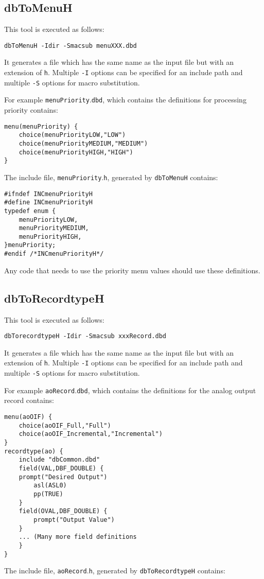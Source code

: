 \subsection{dbToMenuH}

This tool is executed as follows:

\begin{verbatim}dbToMenuH -Idir -Smacsub menuXXX.dbd
\end{verbatim}It generates a file which has the same name as the input file but with an extension of \verb|h|. Multiple \verb|-I| options can be 
specified for an include path and multiple \verb|-S| options for macro substitution.

For example \verb|menuPriority|.\verb|dbd|, which contains the definitions for processing priority contains:

\begin{verbatim}menu(menuPriority) {
    choice(menuPriorityLOW,"LOW")
    choice(menuPriorityMEDIUM,"MEDIUM")
    choice(menuPriorityHIGH,"HIGH")
}
\end{verbatim}The include file, \verb|menuPriority|.\verb|h|, generated by \verb|dbToMenuH| contains:

\begin{verbatim}#ifndef INCmenuPriorityH
#define INCmenuPriorityH
typedef enum {
    menuPriorityLOW,
    menuPriorityMEDIUM,
    menuPriorityHIGH,
}menuPriority;
#endif /*INCmenuPriorityH*/

\end{verbatim}Any code that needs to use the priority menu values should use these definitions.

\subsection{dbToRecordtypeH}

This tool is executed as follows:

\begin{verbatim}dbTorecordtypeH -Idir -Smacsub xxxRecord.dbd
\end{verbatim}It generates a file which has the same name as the input file but with an extension of \verb|h|. Multiple \verb|-I| options can be 
specified for an include path and multiple \verb|-S| options for macro substitution.

For example \verb|aoRecord|.\verb|dbd|, which contains the definitions for the analog output record contains:

\begin{verbatim}
menu(aoOIF) {
    choice(aoOIF_Full,"Full")
    choice(aoOIF_Incremental,"Incremental")
}
recordtype(ao) {
    include "dbCommon.dbd"
    field(VAL,DBF_DOUBLE) {
    prompt("Desired Output")
        asl(ASL0)
        pp(TRUE)
    }
    field(OVAL,DBF_DOUBLE) {
        prompt("Output Value")
    }
    ... (Many more field definitions
    }
}
\end{verbatim}The include file, \verb|aoRecord|.\verb|h|, generated by \verb|dbToRecordtypeH| contains:

